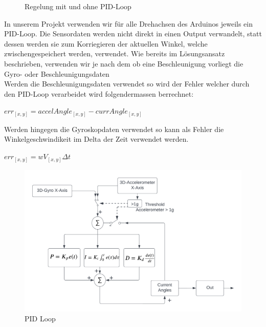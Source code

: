 \begin{figure}[H]
\centering
{}
  \caption{Regelung mit und ohne PID-Loop}
\end{figure}

In unserem Projekt verwenden wir für alle Drehachsen des Arduinos jeweils ein PID-Loop. 
Die Sensordaten werden nicht direkt in einen Output verwandelt, statt dessen werden sie zum Korriegieren der aktuellen Winkel, welche zwischengespeichert werden, verwendet.
Wie bereits im Lösungsansatz beschrieben, verwenden wir je nach dem ob eine Beschleunigung vorliegt die Gyro- oder Beschleunigungsdaten\\
Werden die Beschleunigungsdaten verwendet so wird der Fehler welcher durch den PID-Loop verarbeidet wird folgendermassen berrechnet:

\begin{math} err_[x,y] = accelAngle_[x,y] - currAngle_[x,y] \end{math}

Werden hingegen die Gyroskopdaten verwendet so kann als Fehler die Winkelgeschwindikeit im Delta der Zeit verwendet werden.

\begin{math} err_[x,y] = wV_[x,y]\Delta{t}\end{math}




\begin{figure}[H]
  \begin{center}
    \includegraphics[width=1\linewidth]{content/images/PID_Loop.png}
    \caption{PID Loop}
  \end{center}
\end{figure}


